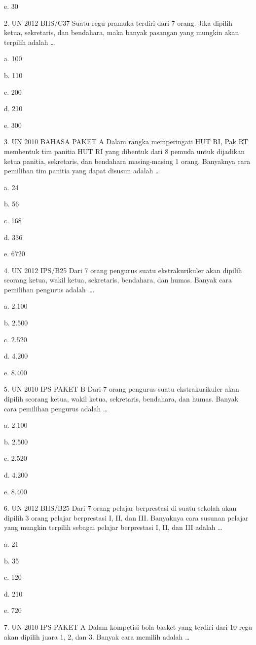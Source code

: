\documentclass[11pt,fleqn]{book} %
\begin{document}
e.	30

2.	UN 2012 BHS/C37
Suatu regu pramuka terdiri dari 7 orang. Jika dipilih ketua, sekretaris, dan bendahara, maka banyak pasangan yang mungkin akan terpilih adalah …

a.	100

b.	110

c.	200

d.	210

e.	300

3.	UN 2010 BAHASA PAKET A 
Dalam rangka memperingati HUT RI, Pak RT membentuk tim panitia HUT RI yang dibentuk dari 8 pemuda untuk dijadikan ketua panitia, sekretaris, dan bendahara masing-masing 1 orang. Banyaknya cara pemilihan tim panitia yang dapat disusun adalah …

a.	24

b.	56

c.	168

d.	336

e.	6720


4.	UN 2012 IPS/B25
Dari 7 orang pengurus suatu ekstrakurikuler akan dipilih seorang ketua, wakil ketua, sekretaris, bendahara, dan humas. Banyak cara pemilihan pengurus adalah ….

a.	2.100

b.	2.500

c.	2.520


d.	4.200

e.	8.400

5.	UN 2010 IPS PAKET B 
Dari 7 orang pengurus suatu ekstrakurikuler akan dipilih seorang ketua, wakil ketua, sekretaris, bendahara, dan humas. Banyak cara pemilihan pengurus adalah …

a.	2.100

b.	2.500

c.	2.520

d.	4.200


e.	8.400

6.	UN 2012 BHS/B25
Dari 7 orang pelajar berprestasi di suatu sekolah akan dipilih 3 orang pelajar berprestasi I, II, dan III. Banyaknya cara susunan pelajar yang mungkin terpilih sebagai pelajar berprestasi I, II, dan III adalah …

a.	21

b.	35

c.	120

d.	210

e.	720


7.	UN 2010 IPS PAKET A 
Dalam kompetisi bola basket yang terdiri dari 10 regu akan dipilih juara 1, 2, dan 3. Banyak cara memilih adalah …
\end{document}
